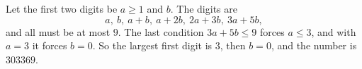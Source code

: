 Let the first two digits be $a\ge1$ and $b$. The digits are
\[
a,\ b,\ a+b,\ a+2b,\ 2a+3b,\ 3a+5b,
\]
and all must be at most $9$. The last condition $3a+5b\le9$ forces $a\le3$, and with $a=3$ it forces $b=0$. So the largest first digit is $3$, then $b=0$, and the number is $\boxed{303369}$.
